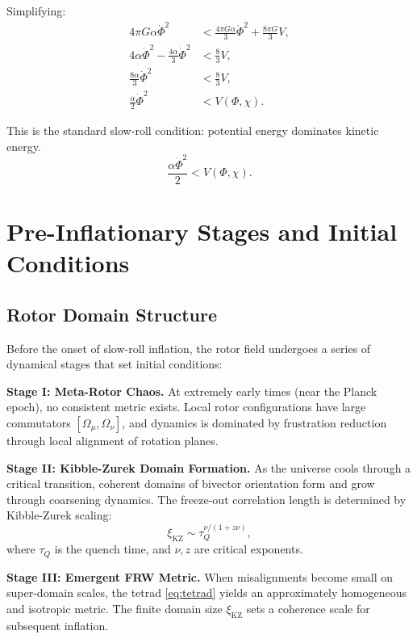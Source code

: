 \documentclass[11pt,a4paper]{article}
\numberwithin{equation}{section}
\theoremstyle{plain}
\theoremstyle{definition}
\theoremstyle{remark}
\begin{document}
Simplifying:
\begin{align}
4\pi G\alpha\dot{\Phi}^2 &< \frac{4\pi G\alpha}{3}\dot{\Phi}^2 + \frac{8\pi G}{3}V,\\
4\alpha\dot{\Phi}^2 - \frac{4\alpha}{3}\dot{\Phi}^2 &< \frac{8}{3}V,\\
\frac{8\alpha}{3}\dot{\Phi}^2 &< \frac{8}{3}V,\\
\frac{\alpha}{2}\dot{\Phi}^2 &< V(\Phi,\chi).
\end{align}

This is the standard slow-roll condition: potential energy dominates kinetic energy.
\begin{equation}
\frac{\alpha\dot{\Phi}^2}{2} < V(\Phi,\chi).
\label{eq:inflation-condition}
\end{equation}

\section{Pre-Inflationary Stages and Initial Conditions}
\label{sec:preinflation}

\subsection{Rotor Domain Structure}

Before the onset of slow-roll inflation, the rotor field undergoes a series of dynamical stages that set initial conditions:

\textbf{Stage I: Meta-Rotor Chaos.} At extremely early times (near the Planck epoch), no consistent metric exists. Local rotor configurations have large commutators $[\Omega_\mu, \Omega_\nu]$, and dynamics is dominated by frustration reduction through local alignment of rotation planes.

\textbf{Stage II: Kibble-Zurek Domain Formation.} As the universe cools through a critical transition, coherent domains of bivector orientation form and grow through coarsening dynamics. The freeze-out correlation length is determined by Kibble-Zurek scaling:
\begin{equation}
\xi_{\mathrm{KZ}} \sim \tau_Q^{\nu/(1+z\nu)},
\label{eq:kibble-zurek}
\end{equation}
where $\tau_Q$ is the quench time, and $\nu, z$ are critical exponents.

\textbf{Stage III: Emergent FRW Metric.} When misalignments become small on super-domain scales, the tetrad \eqref{eq:tetrad} yields an approximately homogeneous and isotropic metric. The finite domain size $\xi_{\mathrm{KZ}}$ sets a coherence scale for subsequent inflation.
\end{document}
